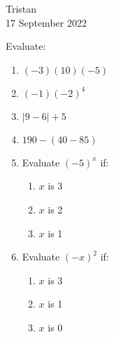 \documentclass[14pt]{extarticle} %
\begin{document}
\hfill Tristan\\
\null\hfill 17 September 2022

\vspace{10mm}

Evaluate:
\begin{enumerate}[label=\Alph*.), itemsep=\fill]
\item  $(-3)(10)(-5)$
\item  $(-1)(-2)^4$
\item  $|9-6|+5$
\item  $190-(40-85)$
\vfill\clearpage
\item Evaluate $(-5)^x$ if:
    \begin{enumerate}[itemsep=\fill]
    \item $x$ is 3
    \item $x$ is 2
    \item $x$ is 1
    \vfill\end{enumerate}
\item Evaluate $(-x)^2$ if:
    \begin{enumerate}[itemsep=\fill]
    \item $x$ is 3
    \item $x$ is 1
    \item $x$ is 0
    \end{enumerate}
\vfill\end{enumerate}
\end{document}
